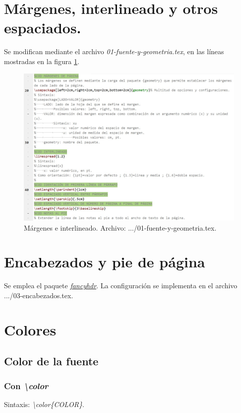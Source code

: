 \section{Márgenes, interlineado y otros espaciados.}
Se modifican mediante el archivo \textit{01-fuente-y-geometria.tex}, en las líneas mostradas en la figura \ref{fig:margenes-interlineado}.
\begin{figure}[H]
	\centering
	\includegraphics[width=1\linewidth, frame]{cuerpo/cap-redaccion/imagenes/margenes-interlineado}
	\caption[Márgenes e interlineado.]{Márgenes e interlineado. Archivo: .../01-fuente-y-geometria.tex.}
	\label{fig:margenes-interlineado}
\end{figure}
%
\section{Encabezados y pie de página}
Se emplea el paquete \href{https://www.ctan.org/pkg/fancyhdr}{\textit{fancyhdr}}. La configuración se implementa en el archivo .../03-encabezados.tex.
%
\section{Colores}
%
\subsection{Color de la fuente}
%
\subsubsection{Con \textit{\textbackslash color}}
Sintaxis: \textit{\textbackslash color\{COLOR\}}.

